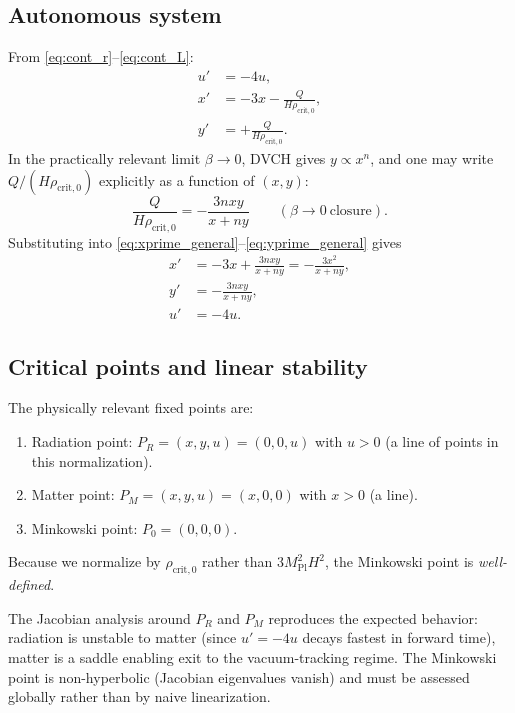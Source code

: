\documentclass[pdflatex,sn-mathphys-num]{sn-jnl}%
\newcommand{\mpl}{M_{\mathrm{Pl}}}
\newcommand{\Ecrit}{\rho_{\mathrm{crit},0}}
\begin{document}
\subsection{Autonomous system}
\label{subsec:autonomous}

From \eqref{eq:cont_r}--\eqref{eq:cont_L}:
\begin{align}
u' &= -4u,
\label{eq:uprime}\\
x' &= -3x - \frac{Q}{H\Ecrit},
\label{eq:xprime_general}\\
y' &= +\frac{Q}{H\Ecrit}.
\label{eq:yprime_general}
\end{align}
In the practically relevant limit $\beta\to 0$, DVCH gives $y\propto x^n$,
and one may write $Q/(H\Ecrit)$ explicitly as a function of $(x,y)$:
\begin{equation}
\frac{Q}{H\Ecrit}
=
- \frac{3nxy}{x+n y}
\qquad (\beta\to 0\ \text{closure}).
\label{eq:Q_over_H}
\end{equation}
Substituting into \eqref{eq:xprime_general}--\eqref{eq:yprime_general} gives
\begin{align}
x' &= -3x + \frac{3nxy}{x+n y}
= -\frac{3x^2}{x+n y},
\label{eq:xprime}\\
y' &= -\frac{3nxy}{x+n y},
\label{eq:yprime}\\
u' &= -4u.
\end{align}

\subsection{Critical points and linear stability}
\label{subsec:critical_points}

The physically relevant fixed points are:
\begin{enumerate}
\item Radiation point: $P_R=(x,y,u)=(0,0,u)$ with $u>0$ (a line of points in
this normalization).
\item Matter point: $P_M=(x,y,u)=(x,0,0)$ with $x>0$ (a line).
\item Minkowski point: $P_0=(0,0,0)$.
\end{enumerate}
Because we normalize by $\Ecrit$ rather than $3\mpl^2H^2$, the Minkowski point
is \emph{well-defined}.

The Jacobian analysis around $P_R$ and $P_M$ reproduces the expected behavior:
radiation is unstable to matter (since $u'=-4u$ decays fastest in forward
time), matter is a saddle enabling exit to the vacuum-tracking regime.
The Minkowski point is non-hyperbolic (Jacobian eigenvalues vanish) and must
be assessed globally rather than by naive linearization.
\end{document}
